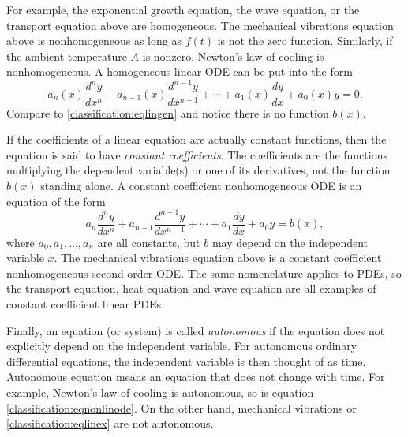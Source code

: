 \documentclass{ximera}
\begin{document}
For example, the exponential growth equation, the wave equation, or the transport equation above are homogeneous. The mechanical vibrations equation above is nonhomogeneous as long as $f(t)$ is not the zero function.  Similarly, if the ambient temperature $A$ is nonzero, Newton's law of cooling is nonhomogeneous. A homogeneous linear ODE can be put into the form
\begin{equation*}
    a_n(x) \frac{d^n y}{dx^n} + a_{n-1}(x) \frac{d^{n-1} y}{dx^{n-1}} +  \cdots + a_{1}(x) \frac{dy}{dx} + a_{0}(x) y = 0 .
\end{equation*}
Compare to \eqref{classification:eqlingen} and notice there is no function $b(x)$.


If the coefficients of a linear equation are actually constant functions, then the equation is said to have \emph{constant coefficients}. The coefficients are the functions multiplying the dependent variable(s) or one of its derivatives, not the function $b(x)$ standing alone. A constant coefficient nonhomogeneous ODE is an equation of the form
\begin{equation*}
    a_n \frac{d^n y}{dx^n} + a_{n-1} \frac{d^{n-1} y}{dx^{n-1}} +  \cdots + a_{1} \frac{dy}{dx} + a_{0} y = b(x) ,
\end{equation*}
where $a_0, a_1, \ldots, a_n$ are all constants, but $b$ may depend on the independent variable $x$. The mechanical vibrations equation above is a constant coefficient nonhomogeneous second order ODE\@. The same nomenclature applies to PDEs, so the transport equation, heat equation and wave equation are all examples of constant coefficient linear PDEs.


Finally, an equation (or system) is called \emph{autonomous} if the equation does not explicitly depend on the independent variable. For autonomous ordinary differential equations, the independent variable is then thought of as time.  Autonomous equation means an equation that does not change with time. For example, Newton's law of cooling is autonomous, so is equation \eqref{classification:eqnonlinode}.  On the other hand, mechanical vibrations or \eqref{classification:eqlinex} are not autonomous.
\end{document}
